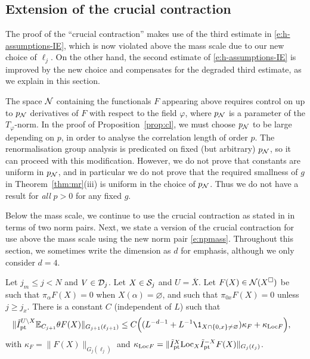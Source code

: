 
\subsection{Extension of the crucial contraction}
\label{sec:cc}

The proof of the ``crucial contraction''
\cite[Proposition \ref{IE-prop:cl}]{BS-rg-IE}
makes use of the  third estimate in
\eqref{e:h-assumptions-IE}, which is now violated above the mass scale
due to our new choice of $\ell_j$.
On the other hand, the second estimate of \eqref{e:h-assumptions-IE} is
improved by the new choice and compensates for the degraded third estimate,
as we explain in this section.

The space $\mathcal{N}$ containing the functionals $F$ appearing above requires control on
up to $p_{\mathcal{N}}$ derivatives of $F$ with respect to the field $\varphi$,
where $p_{\mathcal{N}}$ is a parameter of the $T_\varphi$-norm.
In the proof of Proposition~\ref{prop:cl}, we must choose $p_{\mathcal{N}}$ to be large
depending on $p$, in order to analyse the correlation length
of order $p$.  The renormalisation group analysis is predicated on fixed (but arbitrary)
$p_{\mathcal{N}}$, so it can proceed with this modification.  However,
we do not prove that constants are uniform in $p_{\mathcal{N}}$,
and in particular we do not prove that the required smallness of $g$ in
Theorem~\ref{thm:mr}(iii) is uniform in the choice of $p_{\mathcal{N}}$.
Thus we do not have a result for \emph{all} $p>0$ for any fixed $g$.

Below the mass scale, we continue to use the crucial contraction as stated in
\cite[Proposition \ref{IE-prop:cl}]{BS-rg-IE} in terms of two norm pairs.
Next, we state a version of the crucial contraction for use above the mass
scale using the new norm pair \eqref{e:npmass}.
Throughout this section, we
sometimes write the dimension as $d$ for emphasis, although we only consider $d=4$.


\begin{prop}
\label{prop:cl} Let $j_m \leq j<N$ and $V\in \mathcal{D}_j$.  Let $X \in \mathcal{S}_j$ and
$U = \overline X$.  Let $F(X) \in \mathcal{N}(X^\Box)$ be such that
$\pi_\alpha F(X) =0$ when $X(\alpha)=\varnothing$, and such that
$\pi_{0x}F(X)=0$ unless $j \ge j_x$.
{There is a constant $C$ (independent of $L$) such that}
\begin{align}
    \label{e:contraction3z-new}
    \|\Ipttil^{U\setminus X} \Ex_{C_{j+1}} \theta F (X) \|_{{G_{j+1}(\ell_{j+1})}}
    &
    \leq C \Big(
    ( L^{-d -1} +  L^{-1}\1_{X \cap \{0,x\} \not = \varnothing} )
    \kappa_F
    + \kappa_{\LT F}
    \Big)
    ,
\end{align}
with $\kappa_F=\|F (X)\|_{{G_{j}(\ell_{j})}}$ and
$\kappa_{{\rm Loc} F} =\|\tilde{I}_{\rm pt}^X {\rm Loc}_X \tilde{I}_{\rm pt}^{-X} F(X) \|_{{G_{j}(\ell_{j})}}$.
\end{prop}

